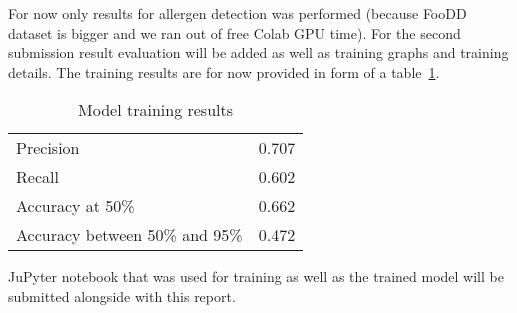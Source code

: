 \documentclass[10pt,twocolumn,letterpaper]{article}
\begin{document}
For now only results for allergen detection was performed (because FooDD dataset is bigger and we ran out of free Colab GPU time).
For the second submission result evaluation will be added as well as training graphs and training details.
The training results are for now provided in form of a table~\ref{results-table}.

\begin{table}[!h]
    \begin{center}
        \caption{Model training results}\label{results-table}
        \begin{tabular}{ l c }
            \toprule
            Precision & 0.707 \\
            Recall & 0.602 \\
            Accuracy at 50\% & 0.662 \\
            Accuracy between 50\% and 95\% & 0.472 \\
            \bottomrule
        \end{tabular}
    \end{center}
\end{table}

JuPyter notebook that was used for training as well as the trained model will be submitted alongside with this report.


{
    \small
    
    
}
\end{document}
